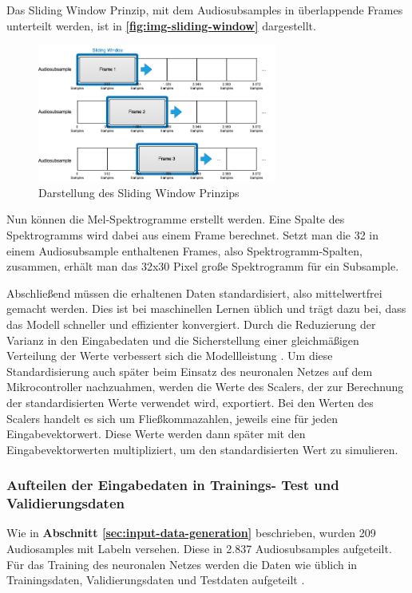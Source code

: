 Das Sliding Window Prinzip, mit dem Audiosubsamples in überlappende Frames unterteilt werden, ist in \textbf{\autoref{fig:img-sliding-window}} dargestellt.

\begin{figure}[h!]
\centering
\includegraphics[width=0.7\textwidth]{images/08_durchfuehrung/nn/sliding_window.png}
\caption{Darstellung des Sliding Window Prinzips}
\label{fig:img-sliding-window}
\end{figure}

Nun können die Mel-Spektrogramme erstellt werden. Eine Spalte des Spektrogramms wird dabei aus einem Frame berechnet. Setzt man die 32 in einem Audiosubsample enthaltenen Frames, also Spektrogramm-Spalten, zusammen, erhält man das 32x30 Pixel große Spektrogramm für ein Subsample.

Abschließend müssen die erhaltenen Daten standardisiert, also mittelwertfrei gemacht werden. Dies ist bei maschinellen Lernen üblich und trägt dazu bei, dass das Modell schneller und effizienter konvergiert. Durch die Reduzierung der Varianz in den Eingabedaten und die Sicherstellung einer gleichmäßigen Verteilung der Werte verbessert sich die Modellleistung \cite{ml-standardization-reason}. Um diese Standardisierung auch später beim Einsatz des neuronalen Netzes auf dem Mikrocontroller nachzuahmen, werden die Werte des Scalers, der zur Berechnung der standardisierten Werte verwendet wird, exportiert. Bei den Werten des Scalers handelt es sich um Fließkommazahlen, jeweils eine für jeden Eingabevektorwert. Diese Werte werden dann später mit den Eingabevektorwerten multipliziert, um den standardisierten Wert zu simulieren.


\subsubsection{Aufteilen der Eingabedaten in Trainings- Test und Validierungsdaten}
Wie in \textbf{Abschnitt \ref{sec:input-data-generation} }beschrieben, wurden 209 Audiosamples mit Labeln versehen. Diese  in 2.837 Audiosubsamples aufgeteilt. Für das Training des neuronalen Netzes werden die Daten wie üblich in Trainingsdaten, Validierungsdaten und Testdaten aufgeteilt \cite{ml-data-splitting-reason}.

